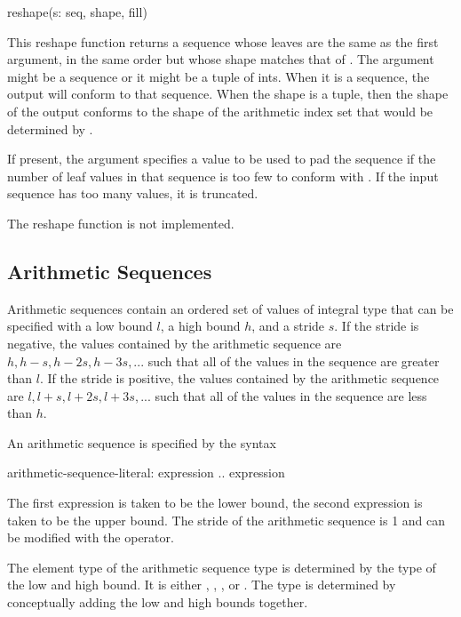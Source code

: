 \begin{chapel}
reshape(s: seq, shape, fill)
\end{chapel}

This reshape function returns a sequence whose leaves are the same as
the first argument, in the same order but whose shape matches that
of . The  argument might be a sequence or it
might be a tuple of ints. When it is a sequence, the output will
conform to that sequence. When the shape is a tuple, then the shape of
the output conforms to the shape of the arithmetic index set that
would be determined by .

If present, the  argument specifies a value to be used to
pad the sequence if the number of leaf values in that sequence is too
few to conform with . If the input sequence has too many
values, it is truncated.

\begin{implementation}
The reshape function is not implemented.
\end{implementation}

\subsection{Arithmetic Sequences}
\label{Arithmetic_Sequences}
Arithmetic sequences contain an ordered set of values of integral type
that can be specified with a low bound $l$, a high bound $h$, and a
stride $s$.  If the stride is negative, the values contained by the
arithmetic sequence are $h, h-s, h-2s, h-3s, ...$ such that all of the
values in the sequence are greater than $l$.  If the stride is
positive, the values contained by the arithmetic sequence are $l, l+s,
l+2s, l+3s, ...$ such that all of the values in the sequence are
less than $h$.

An arithmetic sequence is specified by the syntax
\begin{syntax}
arithmetic-sequence-literal:
  expression .. expression
\end{syntax}
The first expression is taken to be the lower bound, the second
expression is taken to be the upper bound.  The stride of the
arithmetic sequence is 1 and can be modified with the 
operator.

The element type of the arithmetic sequence type is determined by the
type of the low and high bound.  It is
either , , , or .  The
type is determined by conceptually adding the low and high bounds
together.

